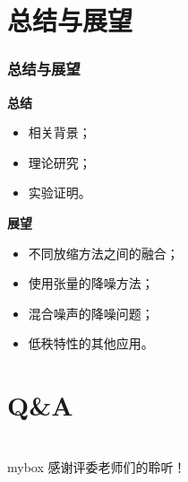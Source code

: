 \documentclass[10pt,aspectratio=43,mathserif]{beamer}
\begin{document}
\section[总结与展望]{总结与展望}
\begin{frame}
\frametitle{\textbf{总结与展望}}
\begin{block}{\textbf{总结}}
\begin{itemize}
\item 相关背景；
\item 理论研究；
\item 实验证明。
\end{itemize}
\end{block}
\begin{block}{\textbf{展望}}
\begin{itemize}
\item 不同放缩方法之间的融合；
\item 使用张量的降噪方法；
\item 混合噪声的降噪问题；
\item 低秩特性的其他应用。
\end{itemize}
\end{block}
\end{frame}
\section[Q\&A]{Q\&A}
%	
\section*{}
\begin{frame}
\begin{center}
\begin{minipage}{1\textwidth}
\begin{beamercolorbox}[wd=0.70\textwidth, rounded=true, shadow=true]{mybox}
\LARGE \centering 感谢评委老师们的聆听！
\end{beamercolorbox}
\end{minipage}
\end{center}
\end{frame}
\end{document}
